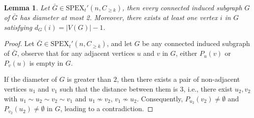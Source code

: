 \documentclass[preprint,12pt]{elsarticle}
\newtheorem{lem}[thm]{Lemma}
\begin{document}
        \begin{lem}\label{CL2}
                 Let $\bar{G} \in \mathrm{SPEX}_t'(n,C_{\geq k})$, then every connected induced subgraph $G$ of $\bar{G}$ has diameter at most 2. Moreover, there exists at least one vertex $i$ in $G$ satisfying $d_{G}(i)=|V(G)|-1$.


        \end{lem}
        \begin{proof}

                Let $\bar{G} \in \mathrm{SPEX}_t'(n,C_{\geq k})$, and let $G$ be any connected induced subgraph of $\bar{G}$, observe that for any adjacent vertices $u$ and $v$ in $G$, either $P_u(v)$ or $P_v(u)$ is empty in $G$.

                If the diameter of $G$ is greater than $2$, then there exists a pair of non-adjacent vertices $u_1$ and $v_1$ such that the distance between them is $3$, i.e., there exist $u_2, v_2$ with $u_1 \sim u_2 \sim v_2 \sim v_1$ and $u_1 \nsim v_2$, $v_1 \nsim u_2$. Consequently, $P_{u_2}(v_2)\neq \emptyset$ and $P_{v_2}(u_2)\neq \emptyset$ in $G$, leading to a contradiction.


\end{proof}
\end{document}
